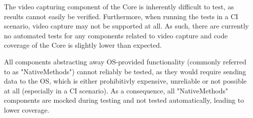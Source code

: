 The video capturing component of the Core is inherently difficult to test, as results cannot easily be verified. Furthermore, when running the tests in a CI scenario, video capture may not be supported at all. As such, there are currently no automated tests for any components related to video capture and code coverage of the Core is slightly lower than expected.

All components abstracting away OS-provided functionality (commonly referred to as "NativeMethods") cannot reliably be tested, as they would require sending data to the OS, which is either prohibitivly expensive, unreliable or not possible at all (especially in a CI scenario). As a consequence, all "NativeMethods" components are mocked during testing and not tested automatically, leading to lower coverage.